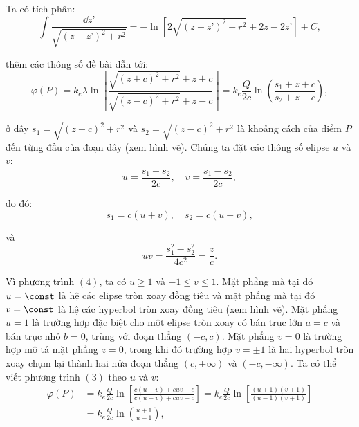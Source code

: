 \begin{loigiai}
\begin{enumerate}[1)]
\begin{center}
\end{center}



Ta có tích phân: 
  \[ \int \frac{\dd z’}{\sqrt{(z-z’)^2 +r^2}} = -\ln\left[2\sqrt{(z-z’)^2 +r^2} + 2z - 2z’ \right] +C , \tag{2} \]

thêm các thông số đề bài dẫn tới:
    \[\varphi(P) = k_e \lambda \ln \left[ \frac{\sqrt{(z+c)^2 + r^2} +z + c}{\sqrt{(z-c)^2 +r^2 } +z -c} \right] = k_e \frac{Q}{2c} \ln \left(\frac{s_1 + z+c }{s_2 + z -c} \right), \tag{3} \]

ở đây $s_1 = \sqrt{(z+c)^2 +r^2} $ và $s_2 = \sqrt{(z-c)^2 +r^2}$ là khoảng cách của điểm $P$ đến từng đầu của đoạn dây (xem hình vẽ). Chúng ta đặt các thông số elipse $u$ và $v$:
  \[ u = \frac{s_1 + s_2}{2c}, \quad v= \frac{s_1 - s_2}{2c}, \tag{4}\]

do đó:
    \[ s_1 = c(u+v), \quad s_2 = c(u-v) , \]

và 
  \[uv = \frac{s_1^2 - s_2^2}{4c^2} = \frac{z}{c} . \tag{5}\]

Vì phương trình $(4)$, ta có $u\geq 1$ và $-1\leq v \leq 1$. Mặt phẳng mà tại đó $u = \const$ là hệ các elipse tròn xoay đồng tiêu và mặt phẳng mà tại đó $v=\const$ là hệ các hyperbol tròn xoay đồng tiêu (xem hình vẽ). Mặt phẳng $u=1$ là trường hợp đặc biệt cho một elipse tròn xoay có bán trục lớn $a=c$ và bán trục nhỏ $b=0$, trùng với đoạn thẳng $(-c,c)$. Mặt phẳng $v=0$ là trường hợp mô tả mặt phẳng $z=0$, trong khi đó trường hợp $v=\pm 1$ là hai hyperbol tròn xoay chụm lại thành hai nửa đoạn thẳng $(c,+\infty)$ và $(-c,-\infty)$. Ta có thể viết phương trình $(3)$ theo $u$ và $v$:
    \[ \begin{aligned} \varphi(P) &= k_e \frac{Q}{2c} \ln \left[ \frac{c(u+v) +cuv+c}{c(u-v) +cuv -c}\right] = k_e \frac{Q}{2c} \ln \left[ \frac{(u+1)(v+1)}{(u-1)(v+1)}\right]\\
     &= k_e \frac{Q}{2c} \ln \left(\frac{u+1}{u-1}\right),\end{aligned} \tag{6} \]


\end{enumerate}
\end{loigiai}
